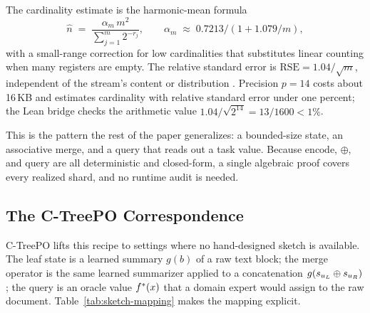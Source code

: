 The cardinality estimate is the harmonic-mean formula
\[
\hat n \;=\; \frac{\alpha_m \, m^2}{\sum_{j=1}^m 2^{-r_j}},
\qquad
\alpha_m \;\approx\; 0.7213 / (1 + 1.079/m),
\]
with a small-range correction for low cardinalities that substitutes
linear counting when many registers are empty. The relative standard error
is $\mathrm{RSE} = 1.04/\sqrt{m}$, independent of the stream's content
or distribution \citep{FlajoletEtAl2007}. Precision $p=14$ costs about
16\,KB and estimates cardinality with relative standard error under one
percent; the Lean bridge checks the arithmetic value
$1.04/\sqrt{2^{14}}=13/1600<1\%$.

This is the pattern the rest of the paper generalizes: a bounded-size
state, an associative merge, and a query that reads out a task value.
Because $\mathrm{encode}$, $\oplus$, and $\mathrm{query}$ are all
deterministic and closed-form, a single algebraic proof covers every
realized shard, and no runtime audit is needed.

\subsection{The C-TreePO Correspondence}

C-TreePO lifts this recipe to settings where no hand-designed sketch is
available. The leaf state is a learned summary $g(b)$ of a raw text block;
the merge operator is the same learned summarizer applied to a
concatenation $g(s_{u_L} \oplus s_{u_R})$; the query is an oracle value
$f^\ast(x)$ that a domain expert would assign to the raw document.
Table~\ref{tab:sketch-mapping} makes the mapping explicit.

